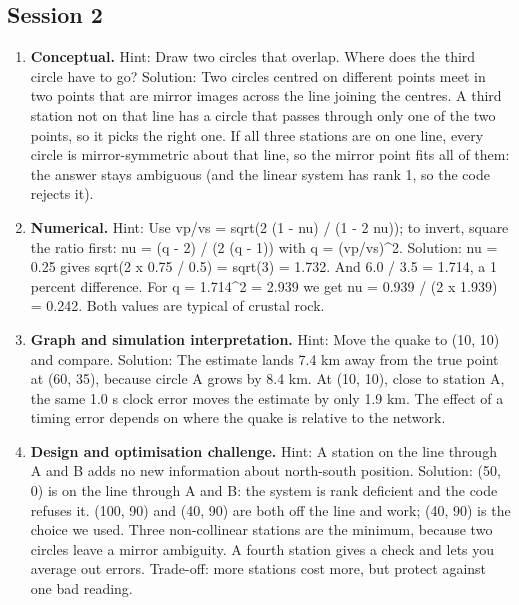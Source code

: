 \documentclass[11pt,a4paper]{article}
\begin{document}
\subsection*{Session 2}
\begin{enumerate}[nosep]
\item \textbf{Conceptual.} Hint: Draw two circles that overlap. Where does the third circle have to go? Solution: Two circles centred on different points meet in two points that are mirror images across the line joining the centres. A third station not on that line has a circle that passes through only one of the two points, so it picks the right one. If all three stations are on one line, every circle is mirror-symmetric about that line, so the mirror point fits all of them: the answer stays ambiguous (and the linear system has rank 1, so the code rejects it).
\item \textbf{Numerical.} Hint: Use vp/vs = sqrt(2 (1 - nu) / (1 - 2 nu)); to invert, square the ratio first: nu = (q - 2) / (2 (q - 1)) with q = (vp/vs)\textasciicircum{}2. Solution: nu = 0.25 gives sqrt(2 x 0.75 / 0.5) = sqrt(3) = 1.732. And 6.0 / 3.5 = 1.714, a 1 percent difference. For q = 1.714\textasciicircum{}2 = 2.939 we get nu = 0.939 / (2 x 1.939) = 0.242. Both values are typical of crustal rock.
\item \textbf{Graph and simulation interpretation.} Hint: Move the quake to (10, 10) and compare. Solution: The estimate lands 7.4 km away from the true point at (60, 35), because circle A grows by 8.4 km. At (10, 10), close to station A, the same 1.0 s clock error moves the estimate by only 1.9 km. The effect of a timing error depends on where the quake is relative to the network.
\item \textbf{Design and optimisation challenge.} Hint: A station on the line through A and B adds no new information about north-south position. Solution: (50, 0) is on the line through A and B: the system is rank deficient and the code refuses it. (100, 90) and (40, 90) are both off the line and work; (40, 90) is the choice we used. Three non-collinear stations are the minimum, because two circles leave a mirror ambiguity. A fourth station gives a check and lets you average out errors. Trade-off: more stations cost more, but protect against one bad reading.
\end{enumerate}
\end{document}

